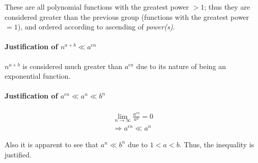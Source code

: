 \documentclass[12pt]{article}
\begin{document}
These are all polynomial functions with the greatest power $> 1$; thus they are considered greater than the previous group (functions with the greatest power $= 1$), and ordered according to ascending of \textit{power(s)}.



\paragraph{Justification of $n^{a+b} \ll a^{\epsilon n} $\newline}

$n^{a+b}$ is considered much greater than $a^{\epsilon n}$ due to its nature of being an exponential function.

\paragraph{Justification of $a^{\epsilon n} \ll a^n \ll b^n$\newline}


\begin{gather}
    \lim\limits_{n \to \infty} \frac{a^{\epsilon n}}{a^n}  = 0 \nonumber \\
    \Rightarrow a^{\epsilon n} \ll a^n
\end{gather}

Also it is apparent to see that $a^n \ll b^n$ due to $1 < a < b$. Thus, the inequality is justified.

%
% 
% 
\end{document}
